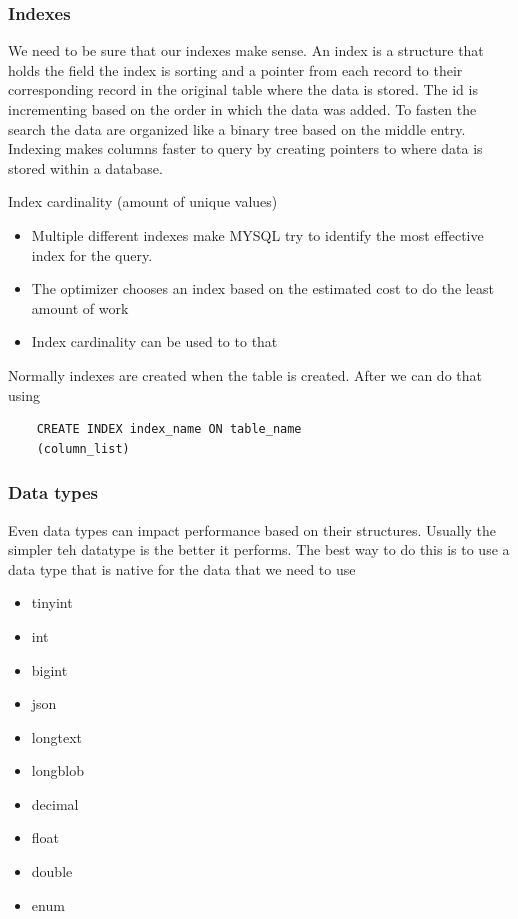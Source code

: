 \subsubsection{Indexes}

We need to be sure that our indexes make sense. An index is a structure that holds the field the index is sorting and a pointer from each record to their corresponding record in the original table where the data is stored. The id is incrementing based on the order in which the data was added. To fasten the search the data are organized like a binary tree based on the middle entry.
Indexing makes columns faster to query by creating pointers to where data is stored within a database.

\vspace{10pt}

Index cardinality (amount of unique values)
\begin{itemize}
    \item Multiple different indexes make MYSQL try to identify the most effective index for the query.
    \item The optimizer chooses an index based on the estimated cost to do the least amount of work
    \item Index cardinality can be used to to that
\end{itemize}


Normally indexes are created when the table is created. After we can do that using

\begin{verbatim}
    CREATE INDEX index_name ON table_name
    (column_list)
\end{verbatim}

\subsubsection{Data types}

Even data types can impact performance based on their structures. Usually the simpler teh datatype is the better it performs. The best way to do this is to use a data type that is native for the data that we need to use

\begin{itemize}
    \item tinyint
    \item int
    \item bigint
    \item json
    \item longtext
    \item longblob
    \item decimal
    \item float
    \item double
    \item enum
\end{itemize}

